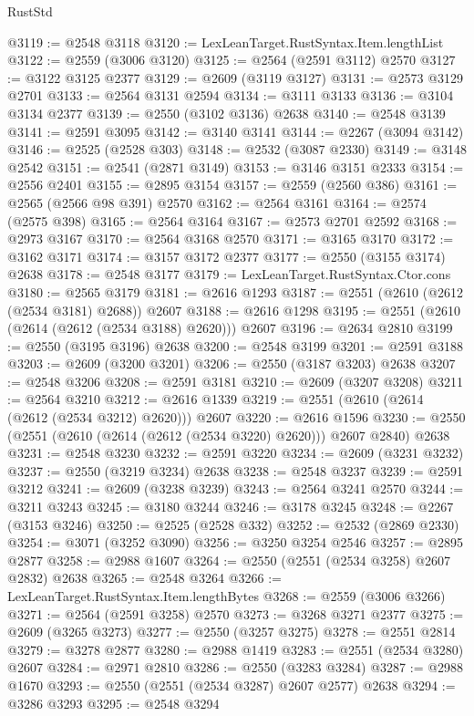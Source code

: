 \begin{lexlean}{RustStd}
\begin{coremodule}
@3119 := @2548 @3118
@3120 := LexLeanTarget.RustSyntax.Item.lengthList
@3122 := @2559 (@3006 @3120)
@3125 := @2564 (@2591 @3112) @2570
@3127 := @3122 @3125 @2377
@3129 := @2609 (@3119 @3127)
@3131 := @2573 @3129 @2701
@3133 := @2564 @3131 @2594
@3134 := @3111 @3133
@3136 := @3104 @3134 @2377
@3139 := @2550 (@3102 @3136) @2638
@3140 := @2548 @3139
@3141 := @2591 @3095
@3142 := @3140 @3141
@3144 := @2267 (@3094 @3142)
@3146 := @2525 (@2528 @303)
@3148 := @2532 (@3087 @2330)
@3149 := @3148 @2542
@3151 := @2541 (@2871 @3149)
@3153 := @3146 @3151 @2333
@3154 := @2556 @2401
@3155 := @2895 @3154
@3157 := @2559 (@2560 @386)
@3161 := @2565 (@2566 @98 @391) @2570
@3162 := @2564 @3161
@3164 := @2574 (@2575 @398)
@3165 := @2564 @3164
@3167 := @2573 @2701 @2592
@3168 := @2973 @3167
@3170 := @2564 @3168 @2570
@3171 := @3165 @3170
@3172 := @3162 @3171
@3174 := @3157 @3172 @2377
@3177 := @2550 (@3155 @3174) @2638
@3178 := @2548 @3177
@3179 := LexLeanTarget.RustSyntax.Ctor.cons
@3180 := @2565 @3179
@3181 := @2616 @1293
@3187 := @2551 (@2610 (@2612 (@2534 @3181) @2688)) @2607
@3188 := @2616 @1298
@3195 := @2551 (@2610 (@2614 (@2612 (@2534 @3188) @2620))) @2607
@3196 := @2634 @2810
@3199 := @2550 (@3195 @3196) @2638
@3200 := @2548 @3199
@3201 := @2591 @3188
@3203 := @2609 (@3200 @3201)
@3206 := @2550 (@3187 @3203) @2638
@3207 := @2548 @3206
@3208 := @2591 @3181
@3210 := @2609 (@3207 @3208)
@3211 := @2564 @3210
@3212 := @2616 @1339
@3219 := @2551 (@2610 (@2614 (@2612 (@2534 @3212) @2620))) @2607
@3220 := @2616 @1596
@3230 := @2550 (@2551 (@2610 (@2614 (@2612 (@2534 @3220) @2620))) @2607 @2840) @2638
@3231 := @2548 @3230
@3232 := @2591 @3220
@3234 := @2609 (@3231 @3232)
@3237 := @2550 (@3219 @3234) @2638
@3238 := @2548 @3237
@3239 := @2591 @3212
@3241 := @2609 (@3238 @3239)
@3243 := @2564 @3241 @2570
@3244 := @3211 @3243
@3245 := @3180 @3244
@3246 := @3178 @3245
@3248 := @2267 (@3153 @3246)
@3250 := @2525 (@2528 @332)
@3252 := @2532 (@2869 @2330)
@3254 := @3071 (@3252 @3090)
@3256 := @3250 @3254 @2546
@3257 := @2895 @2877
@3258 := @2988 @1607
@3264 := @2550 (@2551 (@2534 @3258) @2607 @2832) @2638
@3265 := @2548 @3264
@3266 := LexLeanTarget.RustSyntax.Item.lengthBytes
@3268 := @2559 (@3006 @3266)
@3271 := @2564 (@2591 @3258) @2570
@3273 := @3268 @3271 @2377
@3275 := @2609 (@3265 @3273)
@3277 := @2550 (@3257 @3275)
@3278 := @2551 @2814
@3279 := @3278 @2877
@3280 := @2988 @1419
@3283 := @2551 (@2534 @3280) @2607
@3284 := @2971 @2810
@3286 := @2550 (@3283 @3284)
@3287 := @2988 @1670
@3293 := @2550 (@2551 (@2534 @3287) @2607 @2577) @2638
@3294 := @3286 @3293
@3295 := @2548 @3294

\end{coremodule}
\end{lexlean}
